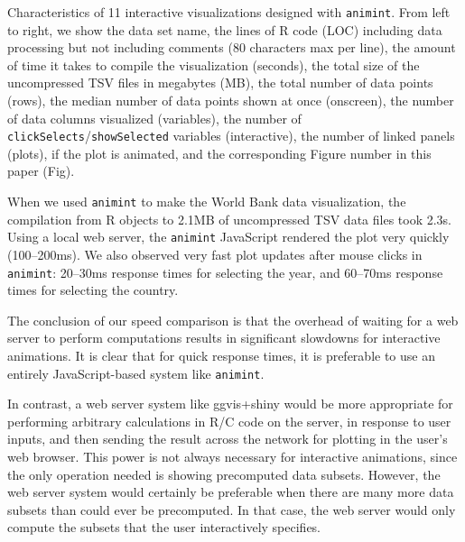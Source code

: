 \documentclass[12pt]{article}\usepackage[]{graphicx}\usepackage[]{color}
\begin{document}
\begin{table}[b!] %
  \centering
  
  \vskip 0.2cm
  \caption{Characteristics of 11 interactive visualizations designed with
    \texttt{animint}. From left to right, we show the data set name, the
    lines of R code (LOC) including data processing but not including comments
    (80 characters max per line),
    the amount of time it takes to compile the visualization (seconds),
    the total size of the uncompressed TSV files in megabytes (MB),
    the total number of data points (rows),
    the median number of data points shown at once (onscreen),
    the number of data columns visualized (variables),
    the number of \texttt{clickSelects}/\texttt{showSelected} variables (interactive),
    the number of linked panels (plots),
    if the plot is animated,
    and the corresponding Figure number in this paper (Fig).
  }
\label{tab:examples}
\end{table}

When we used \texttt{animint} to make the World Bank data visualization, the
compilation from R objects to 2.1MB of uncompressed TSV data files
took 2.3s. Using a local web server, the \texttt{animint} JavaScript rendered
the plot very quickly (100--200ms). We also observed very fast plot
updates after mouse clicks in \texttt{animint}: 20--30ms response times for
selecting the year, and 60--70ms response times for selecting the
country.

The conclusion of our speed comparison is that the overhead of waiting
for a web server to perform computations results in significant
slowdowns for interactive animations. It is clear that for quick
response times, it is preferable to use an entirely JavaScript-based
system like \texttt{animint}.

In contrast, a web server system like ggvis+shiny would be more
appropriate for
performing arbitrary calculations in R/C code on the server, in
response to user inputs, and then sending the result across the
network for plotting in the user's web browser. This power is not
always necessary for interactive animations, since the only operation
needed is showing precomputed data subsets. However, the web server
system would certainly be preferable when there are many more data
subsets than could ever be precomputed. In that case, the web server
would only compute the subsets that the user interactively specifies.
\end{document}
